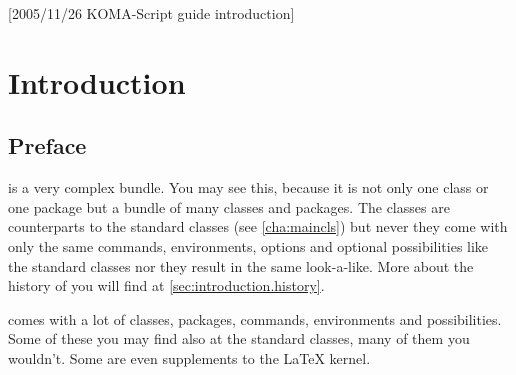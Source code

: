 %
%
%
%
%
%
%
%

[2005/11/26 KOMA-Script guide introduction]

\chapter{Introduction}

\section{Preface}\label{sec:introduction.preface}

{\KOMAScript} is a very complex bundle. You may see this, because it
is not only one class or one package but a bundle of many classes and
packages. The classes are counterparts to the standard classes (see
\autoref{cha:maincls}) but never they come with only the same
commands, environments, options and optional possibilities like the
standard classes nor they result in the same look-a-like. More about
the history of \KOMAScript{} you will find at
\autoref{sec:introduction.history}.

\KOMAScript{} comes with a lot of classes, packages, commands,
environments and possibilities. Some of these you may find also at the
standard classes, many of them you wouldn't. Some are even supplements to
the \LaTeX{} kernel.

